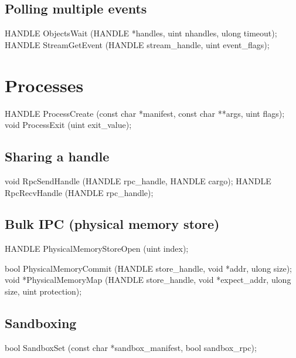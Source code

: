 \subsection*{Polling multiple events}


\begin{paldef}
HANDLE ObjectsWait    (HANDLE *handles, uint nhandles,
                       ulong timeout);
HANDLE StreamGetEvent (HANDLE stream_handle,
                       uint event_flags);
\end{paldef}




\section{Processes}
\label{sec:abi:proc}



\begin{paldef}
HANDLE ProcessCreate (const char *manifest,
                      const char **args, uint flags);
void ProcessExit (uint exit_value);
\end{paldef}



\subsection*{Sharing a handle}


\begin{paldef}
void   RpcSendHandle (HANDLE rpc_handle, HANDLE cargo);
HANDLE RpcRecvHandle (HANDLE rpc_handle);
\end{paldef}



\subsection*{Bulk IPC (physical memory store)}


\begin{paldef}
HANDLE PhysicalMemoryStoreOpen (uint index);
\end{paldef}



\begin{paldef}
bool  PhysicalMemoryCommit (HANDLE store_handle,
                            void *addr, ulong size);
void *PhysicalMemoryMap (HANDLE store_handle,
                         void *expect_addr, ulong size,
                         uint protection);
\end{paldef}


\subsection*{Sandboxing}


\begin{paldef}
bool SandboxSet (const char *sandbox_manifest,
                 bool sandbox_rpc);
\end{paldef}